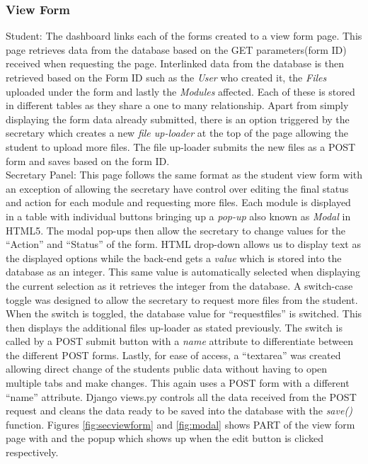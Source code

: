 \documentclass[../main.tex]{subfiles}
\begin{document}
\subsubsection{View Form} 

Student: The dashboard links each of the forms created to a view form page. This page retrieves data from the database based on the GET parameters(form ID) received when requesting the page. Interlinked data from the database is then retrieved based on the Form ID such as the \textit{User} who created it, the \textit{Files} uploaded under the form and lastly the \textit{Modules} affected. Each of these is stored in different tables as they share a one to many relationship. Apart from simply displaying the form data already submitted, there is an option triggered by the secretary which creates a new \textit{file up-loader} at the top of the page allowing the student to upload more files. The file up-loader submits the new files as a POST form and saves based on the form ID. \\[4mm]

Secretary Panel: This page follows the same format as the student view form with an exception of allowing the secretary have control over editing the final status and action for each module and requesting more files. Each module is displayed in a table with individual buttons bringing up a \textit{pop-up} also known as \textit{Modal} in HTML5. The modal pop-ups then allow the secretary to change values for the \enquote{Action} and \enquote{Status} of the form. HTML drop-down allows us to display text as the displayed options while the back-end gets a \textit{value} which is stored into the database as an integer. This same value is automatically selected when displaying the current selection as it retrieves the integer from the database. A switch-case toggle was designed to allow the secretary to request more files from the student. When the switch is toggled, the database value for \enquote{requestfiles} is switched. This then displays the additional files up-loader as stated previously. The switch is called by a POST submit button with a \textit{name} attribute to differentiate between the different POST forms. Lastly, for ease of access, a \enquote{textarea} was created allowing direct change of the students public data without having to open multiple tabs and make changes. This again uses a POST form with a different \enquote{name} attribute. Django views.py controls all the data received from the POST request and cleans the data ready to be saved into the database with the \textit{save()} function. Figures \ref{fig:secviewform} and \ref{fig:modal} shows PART of the view form page with and the popup which shows up when the edit button is clicked respectively.\\[4mm]
\end{document}
